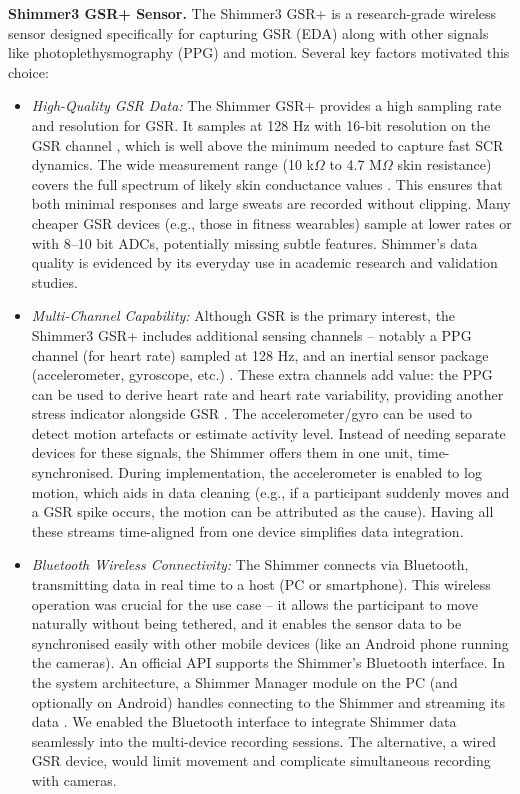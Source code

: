 \textbf{Shimmer3 GSR+ Sensor.} The Shimmer3 GSR+ is a research-grade wireless sensor designed specifically for capturing GSR (EDA) along with other signals like photoplethysmography (PPG) and motion. Several key factors motivated this choice:
\begin{itemize}
    \item \emph{High-Quality GSR Data:} The Shimmer GSR+ provides a high sampling rate and resolution for GSR. It samples at 128 Hz with 16-bit resolution on the GSR channel \cite{ref8}, which is well above the minimum needed to capture fast SCR dynamics. The wide measurement range (10 k$\Omega$ to 4.7 M$\Omega$ skin resistance) covers the full spectrum of likely skin conductance values \cite{ref8}. This ensures that both minimal responses and large sweats are recorded without clipping. Many cheaper GSR devices (e.g., those in fitness wearables) sample at lower rates or with 8--10 bit ADCs, potentially missing subtle features. Shimmer's data quality is evidenced by its everyday use in academic research and validation studies.
    \item \emph{Multi-Channel Capability:} Although GSR is the primary interest, the Shimmer3 GSR+ includes additional sensing channels -- notably a PPG channel (for heart rate) sampled at 128 Hz, and an inertial sensor package (accelerometer, gyroscope, etc.) \cite{ref15}. These extra channels add value: the PPG can be used to derive heart rate and heart rate variability, providing another stress indicator alongside GSR \cite{ref15}. The accelerometer/gyro can be used to detect motion artefacts or estimate activity level. Instead of needing separate devices for these signals, the Shimmer offers them in one unit, time-synchronised. During implementation, the accelerometer is enabled to log motion, which aids in data cleaning (e.g., if a participant suddenly moves and a GSR spike occurs, the motion can be attributed as the cause). Having all these streams time-aligned from one device simplifies data integration.
    \item \emph{Bluetooth Wireless Connectivity:} The Shimmer connects via Bluetooth, transmitting data in real time to a host (PC or smartphone). This wireless operation was crucial for the use case -- it allows the participant to move naturally without being tethered, and it enables the sensor data to be synchronised easily with other mobile devices (like an Android phone running the cameras). An official API supports the Shimmer's Bluetooth interface. In the system architecture, a Shimmer Manager module on the PC (and optionally on Android) handles connecting to the Shimmer and streaming its data \cite{ref15}. We enabled the Bluetooth interface to integrate Shimmer data seamlessly into the multi-device recording sessions. The alternative, a wired GSR device, would limit movement and complicate simultaneous recording with cameras.

\end{itemize}

